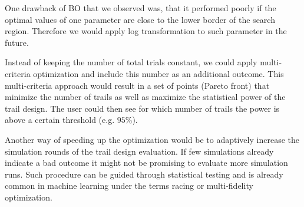 \documentclass[bimj,fleqn]{w-art}
\theoremstyle{plain}
\theoremstyle{definition}
\begin{document}
One drawback of BO that we observed was, that it performed poorly if the optimal values of one parameter are close to the lower border of the search region.
Therefore we would apply log transformation to such parameter in the future.

Instead of keeping the number of total trials constant, we could apply multi-criteria optimization and include this number as an additional outcome.
This multi-criteria approach would result in a set of points (Pareto front) that minimize the number of trails as well as maximize the statistical power of the trail design.
The user could then see for which number of trails the power is above a certain threshold (e.g. $95\%$).

Another way of speeding up the optimization would be to adaptively increase the simulation rounds of the trail design evaluation. 
If few simulations already indicate a bad outcome it might not be promising to evaluate more simulation runs.
Such procedure can be guided through statistical testing and is already common in machine learning under the terms racing or multi-fidelity optimization.


\end{document}
